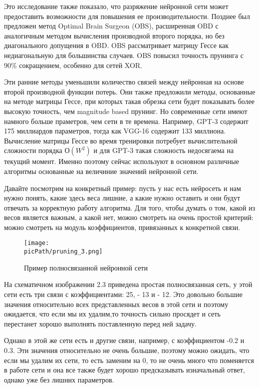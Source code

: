 \documentclass[oneside,final,12pt]{extreport}
\newcommand{\picPath}{images}
\begin{document}
Это исследование также показало, что разряжение нейронной сети может предоставить возможности для повышения ее производительности. Позднее был предложен метод Optimal Brain Surgeon (OBS), расширенная OBD с аналогичным методом вычисления производной второго порядка, но без диагонального допущения в OBD. OBS рассматривает матрицу Гессе как недиагональную для большинства случаев. OBS повысил точность прунинга с 90\% сокращением, особенно для сетей XOR.

Эти ранние методы уменьшили количество связей между нейронная на основе второй производной функции потерь. Они также предложили методы, основанные на методе матрицы Гессе, при которых такая обрезка сети будет показывать более высокую точность, чем magnitude based прунинг. Но современные сети имеют намного больше праметров, чем сети в те времена. Например, GPT-3 содержит 175 миллиардов параметров, тогда как VGG-16 содержит 133 миллиона. Вычисление матрицы Гессе во время тренировки потребует вычислительной сложности порядка $О(W^2)$ и для GPT-3 такая сложность недосягаема на текущий момент. Именно поэтому сейчас используют в основном различные алгоритмы основанные на величиние значений нейронной сети.

Давайте посмотрим на конкретный пример: пусть у нас есть нейросеть и нам нужно понять, какие здесь веса лишние, а какие нужно оставить и они будут отвечать за корректную работу алгоритма. Для того, чтобы думать о том, какой из весов является важным, а какой нет, можно смотреть на очень простой критерий: можно смотреть на модуль коэффициентов, привязанных к конкретной связи.
\begin{figure}[H]
\begin{center}
  \texttt{[image: \\picPath/pruning\_3.png]}
  \caption{Пример полносвязанной нейронной сети}
  \label{fig:pruning_3}
  \end{center}
\end{figure}

На схематичном изображении 2.3 приведена простая полносвязанная сеть, у этой сети есть три связи с коэффициентами: 25, - 13 и - 12. Это довольно большие значения относительно всех представленных весов в этой сети и поэтому ожидается, что если мы их удалим,то точность сильно просядет и сеть перестанет хорошо выполнять поставленную перед ней задачу.

Однако в этой же сети есть и другие связи, например, с коэффициентом -0.2 и 0.3. 
Эти значения относительно не очень большие,  поэтому можно ожидать, что если мы удалим их сети, то есть заменим на 0, то не очень много что поменяется в работе сети и она все также будет хорошо предсказывать изначальный ответ, однако уже без лишних параметров.
 
\end{document}
